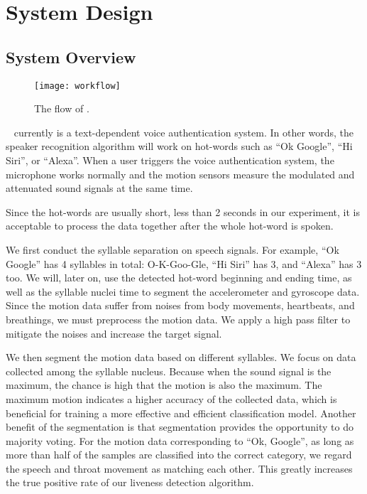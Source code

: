 \section{System Design}
\label{sec:system}
\subsection{System Overview}
\begin{figure*}[h]
	\centering
	\texttt{[image: workflow]}
	\caption{The flow of {\shortname}.}
	\label{fig:workflow}
\end{figure*}
\shortname~ currently is a text-dependent voice authentication system. In other words, the speaker recognition algorithm will work on hot-words such as ``Ok Google'', ``Hi Siri'', or ``Alexa''. When a user triggers the voice authentication system, the microphone works normally and the motion sensors measure the modulated and attenuated sound signals at the same time.


Since the hot-words are usually short, less than 2 seconds in our experiment, it is acceptable to process the data together after the whole hot-word is spoken.

We first conduct the syllable separation on speech signals. For example, ``Ok Google'' has 4 syllables in total: O-K-Goo-Gle, ``Hi Siri'' has 3, and ``Alexa'' has 3 too. We will, later on, use the detected hot-word beginning and ending time, as well as the syllable nuclei time to segment the accelerometer and gyroscope data.
%
Since the motion data suffer from noises from body movements, heartbeats, and breathings, we must preprocess the motion data. We apply a high pass filter to mitigate the noises and increase the target signal. 



We then segment the motion data based on different syllables. We focus on data collected among the syllable nucleus. Because when the sound signal is the maximum, the chance is high that the motion is also the maximum. The maximum motion indicates a higher accuracy of the collected data, which is beneficial for training a more effective and efficient classification model.
%
Another benefit of the segmentation is that segmentation provides the opportunity to do majority voting. For the motion data corresponding to ``Ok, Google'', as long as more than half of the samples are classified into the correct category, we regard the speech and throat movement as matching each other. This greatly increases the true positive rate of our liveness detection algorithm.

